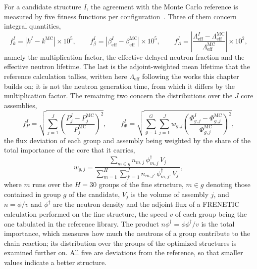 For a candidate structure $I$, the agreement with the Monte Carlo reference is
measured by five fitness functions per configuration~\cite{prevMulti}. Three of
them concern integral quantities,
%
\begin{equation}
  f_k^I = \left|k^I - k^\mathrm{MC}\right|\times10^5, \qquad
  f_{\beta}^I = \left|\beta_\mathrm{eff}^I - \beta_\mathrm{eff}^\mathrm{MC}\right|
  \times10^5, \qquad
  f_{\Lambda}^I = \left|\frac{\Lambda_\mathrm{eff}^I -
  \Lambda_\mathrm{eff}^\mathrm{MC}}{\Lambda_\mathrm{eff}^\mathrm{MC}}\right|\times10^2,
  \label{eg:eqn:integral}
\end{equation}
%
namely the multiplication factor, the effective delayed neutron fraction and
the effective neutron lifetime. The last is the adjoint-weighted mean lifetime
that the reference calculation tallies, written here $\Lambda_\mathrm{eff}$
following the works this chapter builds on; it is not the neutron generation
time, from which it differs by the multiplication factor. The remaining two concern the
distributions over the $J$ core assemblies,
%
\begin{equation}
  f_P^I = \sqrt{\sum_{j=1}^{J}\left(\frac{P_j^I-P_j^\mathrm{MC}}
  {P_j^\mathrm{MC}}\right)^{2}}, \qquad
  f_{\Phi}^I = \sqrt{\sum_{g=1}^{G}\sum_{j=1}^{J} w_{g,j}
  \left(\frac{\Phi_{g,j}^I-\Phi_{g,j}^\mathrm{MC}}
  {\Phi_{g,j}^\mathrm{MC}}\right)^{2}},
  \label{eg:eqn:distributed}
\end{equation}
%
the flux deviation of each group and assembly being weighted by the share of the
total importance of the core that it carries,
%
\begin{equation}
  w_{g,j} = \frac{\sum_{m\in g} n_{m,j}\,\phi^{\dagger}_{m,j}\,V_j}
                 {\sum_{m=1}^{H}\sum_{j'=1}^{J} n_{m,j'}\,\phi^{\dagger}_{m,j'}\,V_{j'}},
  \label{eg:eqn:weight}
\end{equation}
%
where $m$ runs over the $H=30$ groups of the fine structure, $m\in g$ denoting
those contained in group $g$ of the candidate, $V_j$ is the volume of assembly
$j$, and $n=\phi/v$ and $\phi^{\dagger}$ are the neutron density and the adjoint
flux of a FRENETIC calculation performed on the fine structure, the speed $v$ of
each group being the one tabulated in the reference library. The product
$n\phi^{\dagger}=\phi\phi^{\dagger}/v$ is the total importance, which measures how
much the neutrons of a group contribute to the chain reaction; its distribution
over the groups of the optimized structures is examined further on. All
five are deviations from the reference, so that smaller values indicate a better
structure.

